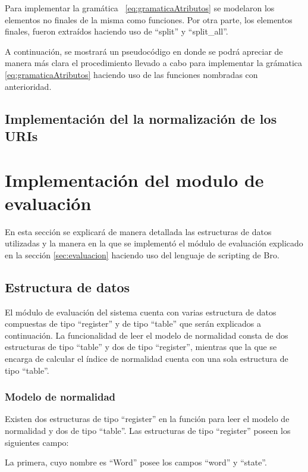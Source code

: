 Para implementar la gramática ~\ref{eq:gramaticaAtributos} se modelaron los elementos no finales de la misma como funciones. Por otra parte, los elementos finales, fueron extraídos haciendo uso de “split” y “split\_all”.

A continuación, se mostrará un pseudocódigo en donde se podrá apreciar de manera más clara el procedimiento llevado a cabo para implementar la grámatica \ref{eq:gramaticaAtributos} haciendo uso de las funciones nombradas con anterioridad.

\subsection{Implementación del la normalización de los URIs}\label{subsec:implementacionNorm}
        
\section{Implementación del modulo de evaluación}
En esta sección se explicará de manera detallada las estructuras de datos utilizadas y la manera en la que se implementó el módulo de evaluación explicado en la sección \ref{sec:evaluacion}  haciendo uso del lenguaje de scripting de Bro. 


\subsection{Estructura de datos}

El módulo de evaluación del sistema cuenta con varias estructura de datos compuestas de tipo “register” y de tipo “table” que serán explicados a continuación. La funcionalidad de leer el modelo de normalidad consta de dos estructuras de tipo “table” y dos de tipo “register”, mientras que la que se encarga de calcular el índice de normalidad cuenta con una sola estructura de tipo “table”.

\subsubsection{Modelo de normalidad}
\label{sssec:estructuraModelo}

Existen dos estructuras de tipo “register” en la función para leer el modelo de normalidad y dos de tipo “table”.
Las estructuras de tipo “register” poseen los siguientes campo:

La primera, cuyo nombre es “Word” posee los campos “word” y  “state”.

